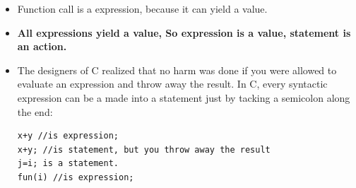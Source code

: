 \documentclass[a4paper,11pt,twoside]{book}
\begin{document}
\begin{itemize}
    \item Function call is a expression, because it can yield a value.
    
    \item \textbf{All expressions yield a value, So expression is a value, statement is an action.}
    

    \item The designers of C realized that no harm was done if you were allowed to evaluate an expression and throw away the result. In C, every syntactic expression can be a made into a statement just by tacking a semicolon along the end:
    
\begin{lstlisting}[numbers=none]
x+y //is expression;
x+y; //is statement, but you throw away the result
j=i; is a statement.
fun(i) //is expression;
\end{lstlisting}
    
\end{itemize}
\end{document}
